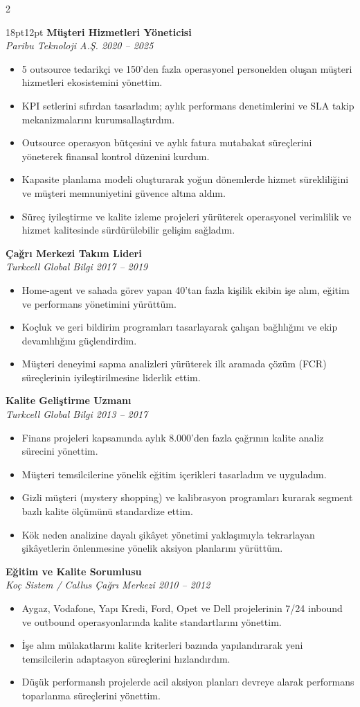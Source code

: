 \documentclass[10pt,a4paper]{article}
\newcommand{\job}[4]{%
  {\color{darktext}\bfseries #1}\\
  {\color{accent}\itshape #2 \hfill #3}\\[2pt]
  \begin{itemize}[leftmargin=12pt,itemsep=1pt,topsep=2pt,label=\textcolor{accent}{$\blacktriangleright$}]
  #4
  \end{itemize}
  \vspace{4pt}
}
\begin{document}
\begin{paracol}{2}
\begin{rightcolumn}
\begin{adjustwidth}{18pt}{12pt}
\job{Müşteri Hizmetleri Yöneticisi}{Paribu Teknoloji A.Ş.}{2020 -- 2025}{%
\item 5 outsource tedarikçi ve 150'den fazla operasyonel personelden oluşan müşteri hizmetleri ekosistemini yönettim.
\item KPI setlerini sıfırdan tasarladım; aylık performans denetimlerini ve SLA takip mekanizmalarını kurumsallaştırdım.
\item Outsource operasyon bütçesini ve aylık fatura mutabakat süreçlerini yöneterek finansal kontrol düzenini kurdum.
\item Kapasite planlama modeli oluşturarak yoğun dönemlerde hizmet sürekliliğini ve müşteri memnuniyetini güvence altına aldım.
\item Süreç iyileştirme ve kalite izleme projeleri yürüterek operasyonel verimlilik ve hizmet kalitesinde sürdürülebilir gelişim sağladım.
}

\job{Çağrı Merkezi Takım Lideri}{Turkcell Global Bilgi}{2017 -- 2019}{%
\item Home-agent ve sahada görev yapan 40'tan fazla kişilik ekibin işe alım, eğitim ve performans yönetimini yürüttüm.
\item Koçluk ve geri bildirim programları tasarlayarak çalışan bağlılığını ve ekip devamlılığını güçlendirdim.
\item Müşteri deneyimi sapma analizleri yürüterek ilk aramada çözüm (FCR) süreçlerinin iyileştirilmesine liderlik ettim.
}

\job{Kalite Geliştirme Uzmanı}{Turkcell Global Bilgi}{2013 -- 2017}{%
\item Finans projeleri kapsamında aylık 8.000'den fazla çağrının kalite analiz sürecini yönettim.
\item Müşteri temsilcilerine yönelik eğitim içerikleri tasarladım ve uyguladım.
\item Gizli müşteri (mystery shopping) ve kalibrasyon programları kurarak segment bazlı kalite ölçümünü standardize ettim.
\item Kök neden analizine dayalı şikâyet yönetimi yaklaşımıyla tekrarlayan şikâyetlerin önlenmesine yönelik aksiyon planlarını yürüttüm.
}

\job{Eğitim ve Kalite Sorumlusu}{Koç Sistem / Callus Çağrı Merkezi}{2010 -- 2012}{%
\item Aygaz, Vodafone, Yapı Kredi, Ford, Opet ve Dell projelerinin 7/24 inbound ve outbound operasyonlarında kalite standartlarını yönettim.
\item İşe alım mülakatlarını kalite kriterleri bazında yapılandırarak yeni temsilcilerin adaptasyon süreçlerini hızlandırdım.
\item Düşük performanslı projelerde acil aksiyon planları devreye alarak performans toparlanma süreçlerini yönettim.
}


\end{adjustwidth}
\end{rightcolumn}
\end{paracol}
\end{document}
